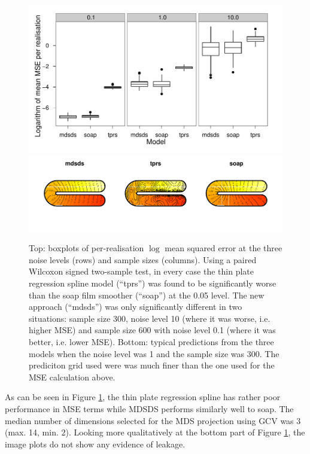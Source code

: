 \documentclass[useAMS, referee]{biom}
\begin{document}
\begin{figure}
\centering
\includegraphics[width=\textwidth]{examples/ramsay/ramsay-result.pdf} \\ \includegraphics[width=\textwidth]{examples/ramsay/ramsay-real.pdf}
\caption{Top: boxplots of per-realisation $\log$ mean squared error at the three noise levels (rows) and sample sizes (columns). Using a paired Wilcoxon signed two-sample test, in every case the thin plate regression spline model (``tprs'') was found to be significantly worse than the soap film smoother (``soap'') at the 0.05 level. The new approach (``mdsds'') was only significantly different in two situations: sample size 300, noise level 10 (where it was worse, i.e. higher MSE) and sample size 600 with noise level 0.1 (where it was better, i.e. lower MSE). Bottom: typical predictions from the three models when the noise level was 1 and the sample size was 300. The prediciton grid used were was much finer than the one used for the MSE calculation above.}
\label{ramsay-results}
\end{figure}

As can be seen in Figure \ref{ramsay-results}, the thin plate regression spline has rather poor performance in MSE terms while MDSDS performs similarly well to soap. The median number of dimensions selected for the MDS projection using GCV was 3 (max. 14, min. 2). Looking more qualitatively at the bottom part of Figure \ref{ramsay-results}, the image plots do not show any evidence of leakage.
\end{document}
